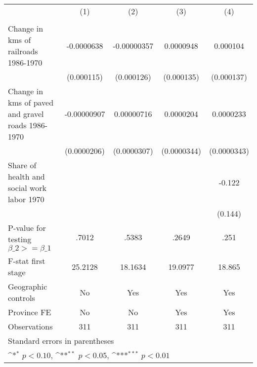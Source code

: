 {
\def\sym#1{\ifmmode^{#1}\else\(^{#1}\)\fi}
\begin{tabular}{l*{4}{c}}
\hline\hline
                &\multicolumn{1}{c}{(1)}&\multicolumn{1}{c}{(2)}&\multicolumn{1}{c}{(3)}&\multicolumn{1}{c}{(4)}\\
                &\multicolumn{1}{c}{}&\multicolumn{1}{c}{}&\multicolumn{1}{c}{}&\multicolumn{1}{c}{}\\
\hline
Change in kms of railroads 1986-1970&-0.0000638         &-0.00000357         &0.0000948         & 0.000104         \\
                &(0.000115)         &(0.000126)         &(0.000135)         &(0.000137)         \\
[1em]
Change in kms of paved and gravel roads 1986-1970&-0.00000907         &0.00000716         &0.0000204         &0.0000233         \\
                &(0.0000206)         &(0.0000307)         &(0.0000344)         &(0.0000343)         \\
[1em]
Share of health and social work labor 1970&                  &                  &                  &   -0.122         \\
                &                  &                  &                  &  (0.144)         \\
\hline
P-value for testing $\beta\_{2} >= \beta\_{1}$&    .7012         &    .5383         &    .2649         &     .251         \\
F-stat first stage&  25.2128         &  18.1634         &  19.0977         &   18.865         \\
Geographic controls&       No         &      Yes         &      Yes         &      Yes         \\
Province FE     &       No         &       No         &      Yes         &      Yes         \\
Observations    &      311         &      311         &      311         &      311         \\
\hline\hline
\multicolumn{5}{l}{\footnotesize Standard errors in parentheses}\\
\multicolumn{5}{l}{\footnotesize \sym{*} \(p<0.10\), \sym{**} \(p<0.05\), \sym{***} \(p<0.01\)}\\
\end{tabular}
}
